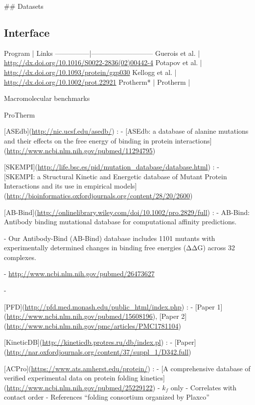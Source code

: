 ## Datasets

\subsection{Interface}


Program        | Links
---------------|---------------------------
Guerois et al. | \url{http://dx.doi.org/10.1016/S0022-2836(02)00442-4}
Potapov et al. | \url{http://dx.doi.org/10.1093/protein/gzp030}
Kellogg et al. | \url{http://dx.doi.org/10.1002/prot.22921}
Protherm*      |
Protherm       |

Macromolecular benchmarks

ProTherm \cite{Zeng2011} \cite{kumar_protherm_2006}


[ASEdb](\url{http://nic.ucsf.edu/asedb/})
: - [ASEdb: a database of alanine mutations and their effects on the free energy of binding in protein interactions](\url{http://www.ncbi.nlm.nih.gov/pubmed/11294795})

[SKEMPI](\url{http://life.bsc.es/pid/mutation_database/database.html})
: - [SKEMPI: a Structural Kinetic and Energetic database of Mutant Protein Interactions and its use in empirical models](\url{http://bioinformatics.oxfordjournals.org/content/28/20/2600})

[AB-Bind](\url{http://onlinelibrary.wiley.com/doi/10.1002/pro.2829/full})
: -
AB-Bind: Antibody binding mutational database for computational affinity predictions.

  - Our Antibody-Bind (AB-Bind) database includes 1101 mutants with experimentally determined changes in binding free energies (ΔΔG) across 32 complexes.

  - \url{http://www.ncbi.nlm.nih.gov/pubmed/26473627}

  - \cite{sirin_ab-bind:_2016}



[PFD](\url{http://pfd.med.monash.edu/public_html/index.php})
: - [Paper 1](\url{http://www.ncbi.nlm.nih.gov/pubmed/15608196}), [Paper 2](\url{http://www.ncbi.nlm.nih.gov/pmc/articles/PMC1781104})


[KineticDB](\url{http://kineticdb.protres.ru/db/index.pl})
: - [Paper](\url{http://nar.oxfordjournals.org/content/37/suppl_1/D342.full})


[ACPro](\url{https://www.ats.amherst.edu/protein/})
: - [A comprehensive database of verified experimental data on protein folding kinetics](\url{http://www.ncbi.nlm.nih.gov/pubmed/25229122})
  - $k_{f}$ only
  - Correlates with contact order
  - References ``folding consortium organized by Plaxco''
